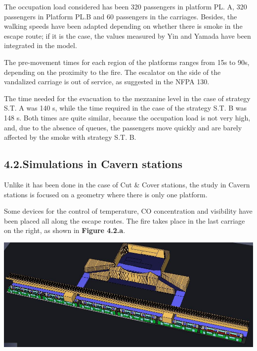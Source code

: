 \documentclass{article}
\begin{document}
The occupation load considered has been 320 passengers in platform PL. A, 320 
passengers in Platform PL.B and 60 passengers in the carriages. Besides, the 
walking speeds have been adapted depending on whether there is smoke in the 
escape route; if it is the case, the values measured by Yin and Yamada have 
been integrated in the model.%

The pre-movement times for each region of the platforms ranges from 15s to 90s, 
depending on the proximity to the fire. The escalator on the side of the vandalized 
carriage is out of service, as suggested in the NFPA 130.%

The time needed for the evacuation to the mezzanine level in the case of strategy 
S.T. A was 140 s, while the time required in the case of the strategy S.T. B was 
148 s. Both times are quite similar, because the occupation load is not very high, 
and, due to the absence of queues, the passengers move quickly and are barely 
affected by the smoke with strategy S.T. B.%

\subsection{4.2.\hspace*{0.5em}Simulations in Cavern stations}\label{sec-simulations-in-cavern-stations}%

\noindent{}Unlike it has been done in the case of Cut \& Cover stations, the study in Cavern 
stations is focused on a geometry where there is only one platform.%

Some devices for the control of temperature, CO concentration and visibility have 
been placed all along the escape routes. The fire takes place in the last carriage 
on the right, as shown in \textbf{Figure 4.2.a}.%

\begin{mdcenter}%

\noindent{}\includegraphics[keepaspectratio=true,width=\dimmin{}{\dimwidth{0.55}}]{images/Fig-4.2.a}{}%
\end{mdcenter}%
\end{document}
